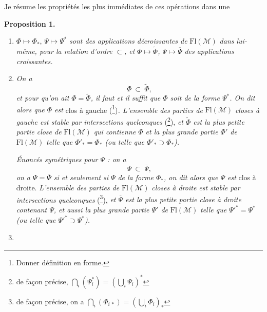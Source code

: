 \documentclass[11pt]{article}
\newcommand{\printedpage}[1]{\marginpar{\footnotesize p.~#1}}
\newcommand{\msp}[1]{\marginpar{\footnotesize [#1]}}
\newcommand{\Fl}{\mathrm{Fl}}
\newcommand{\M}{\mathcal{M}}
\begin{document}
\msp{page 2}

Je résume les propriétés les plus immédiates de ces opérations dans une

\noindent\textbf{Proposition 1.}

\begin{enumerate}[label={}]
\item[a)] $\Phi \longmapsto \Phi_*$, $\Psi \longmapsto \Psi^*$ \textit{sont des applications décroissantes de} $\Fl(\M)$ \textit{dans lui-même, pour la relation d'ordre} $\subset$\textit{, et} $\Phi \longmapsto \widetilde{\Phi}$\textit{,} $\Psi \longmapsto \overline{\Psi}$ \textit{des applications croissantes.}

\printedpage{2}

\item[b)] \textit{On a}
\[
\Phi\ \subset\ \widetilde{\Phi},
\]
\textit{et pour qu'on ait $\Phi = \widetilde{\Phi}$, il faut et il suffit que $\Phi$ soit de la forme $\Psi^*$. On dit alors que $\Phi$ est} \textup{clos à gauche} (\footnote[2]{Donner définition en forme.})\textit{. L'ensemble des parties de} $\Fl(\M)$ \textit{closes à gauche est stable par intersections quelconques} (\footnote[3]{de façon précise, $\bigcap_i(\Psi_i^*) = (\bigcup_i \Psi_i)^*$}), \textit{et $\widetilde{\Phi}$ est la plus petite partie close de} $\Fl(\M)$ \textit{qui contienne $\Phi$ et la plus grande partie $\Phi'$ de} $\Fl(\M)$ \textit{telle que $\Phi'_* = \Phi_*$ (ou telle que $\Phi'_* \supset \Phi_*$).}

\textit{Énoncés symétriques pour $\Psi$ : on a}
\[
\Psi\ \subset\ \overline{\Psi},
\]
\textit{on a $\Psi = \overline{\Psi}$ si et seulement si $\Psi$} \textit{de la forme $\Phi_*$, on dit alors que $\Psi$ est} \textup{clos à droite.} \textit{L'ensemble des parties de} $\Fl(\M)$ \textit{closes à droite est stable par intersections quelconques} (\footnote[4]{de façon précise, on a $\bigcap_i(\Phi_{i\,*}) = (\bigcup_i \Phi_i)_*$}), \textit{et $\overline{\Psi}$ est la plus petite partie close à droite contenant $\Psi$, et aussi la plus grande partie $\Psi'$ de} $\Fl(\M)$ \textit{telle que $\Psi'^* = \Psi^*$ (ou telle que $\Psi'^* \supset \Psi^*$).}

\item[] \hspace*{-2.5em}\msp{page 3}


\end{enumerate}
\end{document}
